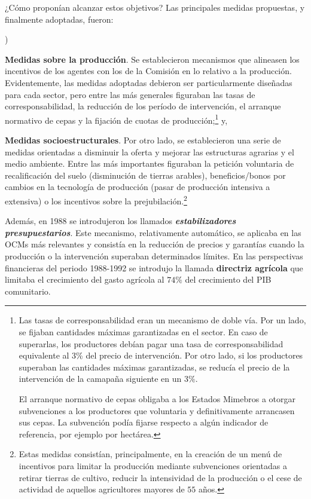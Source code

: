 \documentclass[10pt,a4paper]{article}
\newcounter{alphaitem}
\newenvironment{la}
      {\begin{list}{\alph{alphaitem})}{%
          \usecounter{alphaitem}%
          \setlength{\leftmargin}{1cm}%
          \setlength{\parskip}{3pt}%
          \setlength{\itemsep}{0pt}%
          \setlength{\parsep}{0pt}%
      }}
      {\end{list}}
\begin{document}
¿Cómo proponían alcanzar estos objetivos? Las principales medidas propuestas, y finalmente adoptadas, fueron:
\begin{la}
    \item \textbf{Medidas sobre la producción}. Se establecieron mecanismos que alineasen los incentivos de los agentes con los de la Comisión en lo relativo a la producción. Evidentemente, las medidas adoptadas debieron ser particularmente diseñadas para cada sector, pero entre las más generales figuraban las tasas de corresponsabilidad, la reducción de los período de intervención, el arranque normativo de cepas y la fijación de cuotas de producción;\footnote{%
        Las tasas de corresponsabilidad eran un mecanismo de doble vía. Por un lado, se fijaban cantidades máximas garantizadas en el sector. En caso de superarlas, los productores debían pagar una tasa de corresponsabilidad equivalente al 3\% del precio de intervención. Por otro lado, si los productores superaban las cantidades máximas garantizadas, se reducía el precio de la intervención de la camapaña siguiente en un $3\%$. 

    El arranque normativo de cepas obligaba a los Estados Mimebros a otorgar subvenciones a los productores que voluntaria y definitivamente arrancasen sus cepas. La subvención podía fijarse respecto a algún indicador de referencia, por ejemplo por hectárea.
    } y,
    \item \textbf{Medidas socioestructurales}. Por otro lado, se establecieron una serie de medidas orientadas a disminuir la oferta y mejorar las estructuras agrarias y el medio ambiente. Entre las más importantes figuraban la petición voluntaria de recalificación del suelo (disminución de tierras arables), beneficios/bonos por cambios en la tecnología de producción (pasar de producción intensiva a extensiva) o los incentivos sobre la prejubilación.\footnote{%
        Estas medidas consistían, principalmente, en la creación de un menú de incentivos para limitar la producción mediante subvenciones orientadas a retirar tierras de cultivo, reducir la intensividad de la producción o el cese de actividad de aquellos agricultores mayores de $55$ años.
    }
\end{la}

Además, en 1988 se introdujeron los llamados \textit{\textbf{estabilizadores presupuestarios}}. Este mecanismo, relativamente automático, se aplicaba en las OCMs más relevantes y consistía en la reducción de precios y garantías cuando la producción o la intervención superaban determinados límites. En las perspectivas financieras del periodo 1988-1992 se introdujo la llamada \textbf{directriz agrícola} que limitaba el crecimiento del gasto agrícola al $74\%$ del crecimiento del PIB comunitario.
\end{document}
